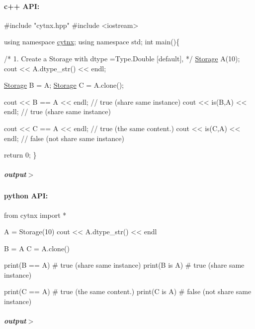 \paragraph*{c++ A\+PI\+:}


\begin{DoxyCodeInclude}
\textcolor{preprocessor}{#include "cytnx.hpp"}
\textcolor{preprocessor}{#include <iostream>}


\textcolor{keyword}{using namespace }\hyperlink{namespacecytnx}{cytnx};
\textcolor{keyword}{using namespace }std;
\textcolor{keywordtype}{int} main()\{ 

    \textcolor{comment}{/*}
\textcolor{comment}{        1. Create a Storage with }
\textcolor{comment}{        dtype =Type.Double [default],}
\textcolor{comment}{    */}
    \hyperlink{classcytnx_1_1Storage}{Storage} A(10);
    cout << A.dtype\_str() << endl;

    \hyperlink{classcytnx_1_1Storage}{Storage} B = A;  
    \hyperlink{classcytnx_1_1Storage}{Storage} C = A.clone();

    cout << B == A << endl; \textcolor{comment}{// true (share same instance)}
    cout << is(B,A) << endl; \textcolor{comment}{// true (share same instance)}
  
    cout << C == A << endl;  \textcolor{comment}{// true (the same content.)}
    cout << is(C,A) << endl; \textcolor{comment}{// false (not share same instance)}
 

    \textcolor{keywordflow}{return} 0;
\}

\end{DoxyCodeInclude}
 \subparagraph*{output$>$}


\begin{DoxyVerbInclude}
\end{DoxyVerbInclude}
 \paragraph*{python A\+PI\+:}


\begin{DoxyCodeInclude}
\textcolor{keyword}{from} cytnx \textcolor{keyword}{import} *


A = Storage(10)
cout << A.dtype\_str() << endl

B = A
C = A.clone()

print(B == A) \textcolor{comment}{# true (share same instance)}
print(B \textcolor{keywordflow}{is} A) \textcolor{comment}{# true (share same instance)}

print(C == A)  \textcolor{comment}{# true (the same content.)}
print(C \textcolor{keywordflow}{is} A)  \textcolor{comment}{# false (not share same instance)}
\end{DoxyCodeInclude}
 \subparagraph*{output$>$}


